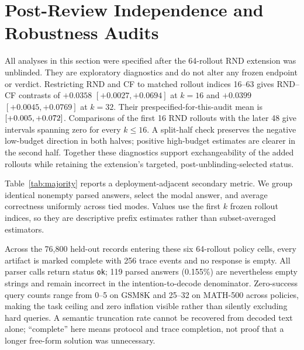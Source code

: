 \documentclass[11pt]{article}
\begin{document}
\section{Post-Review Independence and Robustness Audits}
\label{app:postreview}

All analyses in this section were specified after the 64-rollout RND extension was unblinded. They are exploratory diagnostics and do not alter any frozen endpoint or verdict. Restricting RND and CF to matched rollout indices 16--63 gives RND--CF contrasts of $+0.0358$ $[+0.0027,+0.0694]$ at $k=16$ and $+0.0399$ $[+0.0045,+0.0769]$ at $k=32$. Their prespecified-for-this-audit mean is \RandomNewPoint{} $[+0.005{},+0.072{}]$. Comparisons of the first 16 RND rollouts with the later 48 give intervals spanning zero for every $k\leq16$. A split-half check preserves the negative low-budget direction in both halves; positive high-budget estimates are clearer in the second half. Together these diagnostics support exchangeability of the added rollouts while retaining the extension's targeted, post-unblinding-selected status.

Table~\ref{tab:majority} reports a deployment-adjacent secondary metric. We group identical nonempty parsed answers, select the modal answer, and average correctness uniformly across tied modes. Values use the first $k$ frozen rollout indices, so they are descriptive prefix estimates rather than subset-averaged estimators.

\begin{table}[h]
\caption{Equal-task pooled tie-aware majority-vote accuracy. This analysis was selected after outcomes were read and has no multiplicity-adjusted intervals.}
\label{tab:majority}
\centering
\small
{}
\end{table}

Across the 76,800 held-out records entering these six 64-rollout policy cells, every artifact is marked complete with 256 trace events and no response is empty. All parser calls return status \texttt{ok}; 119 parsed answers (0.155\%) are nevertheless empty strings and remain incorrect in the intention-to-decode denominator. Zero-success query counts range from 0--5 on GSM8K and 25--32 on MATH-500 across policies, making the task ceiling and zero inflation visible rather than silently excluding hard queries. A semantic truncation rate cannot be recovered from decoded text alone; ``complete'' here means protocol and trace completion, not proof that a longer free-form solution was unnecessary.
\end{document}
